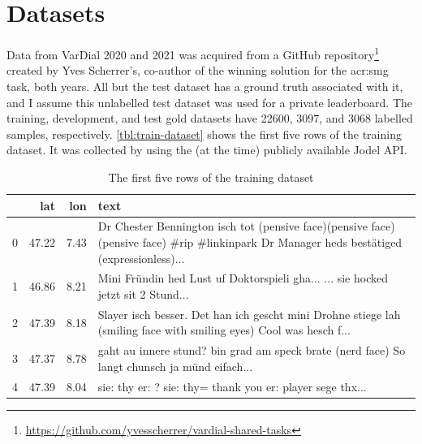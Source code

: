 \section{Datasets}
\label{sec:datasets}

Data from VarDial 2020 and 2021 was acquired from a GitHub repository\footnote{\url{https://github.com/yvesscherrer/vardial-shared-tasks}} created by Yves Scherrer's, co-author of the winning solution for the \gls{acr:smg} task, both years. All but the test dataset has a ground truth associated with it, and I assume this unlabelled test dataset was used for a private leaderboard. The training, development, and test gold datasets have 22600, 3097, and 3068 labelled samples, respectively. \autoref{tbl:train-dataset} shows the first five rows of the training dataset. It was collected by \cite[2-3]{hovyCapturingRegionalVariation2018} using the (at the time) publicly available Jodel API.

\begin{table}
    \centering
    \begin{tabular}{l|rr|p{}}
        \toprule
          & lat   & lon  & text                                                                                                                                        \\
        \midrule
        0 & 47.22 & 7.43 & Dr Chester Bennington isch tot (pensive face)(pensive face)(pensive face) \#rip \#linkinpark Dr Manager heds bestätiged (expressionless)... \\
        1 & 46.86 & 8.21 & Mini Fründin hed Lust uf Doktorspieli gha... ... sie hocked jetzt sit 2 Stund...                                                            \\
        2 & 47.39 & 8.18 & Slayer isch besser. Det han ich gescht mini Drohne stiege lah (smiling face with smiling eyes) Cool was hesch f...                          \\
        3 & 47.37 & 8.78 & gaht au innere stund? bin grad am speck brate (nerd face) So langt chunsch ja münd eifach...                                                \\
        4 & 47.39 & 8.04 & sie: thy er: ? sie: thy= thank you er: player sege thx...                                                                                   \\
        \bottomrule
    \end{tabular}
    \caption{The first five rows of the training dataset}
    \label{tbl:train-dataset}
\end{table}

